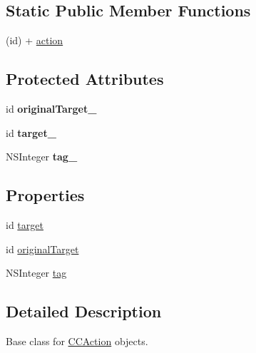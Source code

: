 \subsection*{Static Public Member Functions}
\begin{DoxyCompactItemize}
\item 
(id) + \hyperlink{interface_c_c_action_ac8333ff6fa011cac61ea373525cde4c5}{action}
\end{DoxyCompactItemize}
\subsection*{Protected Attributes}
\begin{DoxyCompactItemize}
\item 
\hypertarget{interface_c_c_action_ac311b1c88025024523002ababa9eb057}{id {\bfseries original\-Target\-\_\-}}\label{interface_c_c_action_ac311b1c88025024523002ababa9eb057}

\item 
\hypertarget{interface_c_c_action_a582c1c3b500d334b3421a873d6d3f14c}{id {\bfseries target\-\_\-}}\label{interface_c_c_action_a582c1c3b500d334b3421a873d6d3f14c}

\item 
\hypertarget{interface_c_c_action_a90ebd42e6dfb210fad4599e822e220ac}{N\-S\-Integer {\bfseries tag\-\_\-}}\label{interface_c_c_action_a90ebd42e6dfb210fad4599e822e220ac}

\end{DoxyCompactItemize}
\subsection*{Properties}
\begin{DoxyCompactItemize}
\item 
id \hyperlink{interface_c_c_action_a091582cf24bddda501fb6110991fb82c}{target}
\item 
id \hyperlink{interface_c_c_action_ad71b8a496d6d22b8854768276f0bb8c6}{original\-Target}
\item 
N\-S\-Integer \hyperlink{interface_c_c_action_a944bcf8bdf05e045b48888783cfbd223}{tag}
\end{DoxyCompactItemize}


\subsection{Detailed Description}
Base class for \hyperlink{interface_c_c_action}{C\-C\-Action} objects. 

